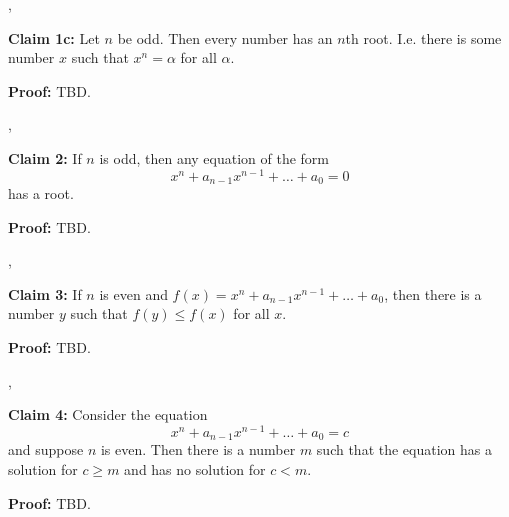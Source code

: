 \sep

\textbf{Claim 1c:} Let $n$ be odd. Then every number has an $n$th
root. I.e. there is some number $x$ such that $x^{n}=\alpha$ for all $\alpha$.

\vs

\textbf{Proof:} TBD.

\sep

\textbf{Claim 2:} If $n$ is odd, then any equation of the form
\[x^{n}+a_{n-1}x^{n-1}+\ldots+a_{0}=0\]
has a root.

\vs

\textbf{Proof:} TBD.

\sep

\textbf{Claim 3:} If $n$ is even and
$f(x)=x^{n}+a_{n-1}x^{n-1}+\ldots+a_{0}$, then there is a number $y$ such
that $f(y)\leq f(x)$ for all $x$.

\vs

\textbf{Proof:} TBD.

\sep

\textbf{Claim 4:} Consider the equation
\[x^{n}+a_{n-1}x^{n-1}+\ldots+a_{0}=c\]
and suppose $n$ is even. Then there is a number $m$ such that the
equation has a solution for $c\geq m$ and has no solution for $c<m$.

\vs

\textbf{Proof:} TBD.

\vs




